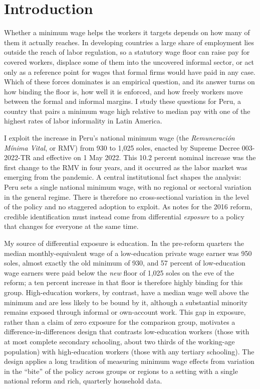 \section{Introduction}\label{sec:intro}

Whether a minimum wage helps the workers it targets depends on how many of them it actually reaches. In developing countries a large share of employment lies outside the reach of labor regulation, so a statutory wage floor can raise pay for covered workers, displace some of them into the uncovered informal sector, or act only as a reference point for wages that formal firms would have paid in any case. Which of these forces dominates is an empirical question, and its answer turns on how binding the floor is, how well it is enforced, and how freely workers move between the formal and informal margins. I study these questions for Peru, a country that pairs a minimum wage high relative to median pay with one of the highest rates of labor informality in Latin America.

I exploit the increase in Peru's national minimum wage (the \emph{Remuneración Mínima Vital}, or RMV) from 930 to 1,025 soles, enacted by Supreme Decree 003-2022-TR and effective on 1 May 2022. This 10.2 percent nominal increase was the first change to the RMV in four years, and it occurred as the labor market was emerging from the pandemic. A central institutional fact shapes the analysis: Peru sets a single national minimum wage, with no regional or sectoral variation in the general regime. There is therefore no cross-sectional variation in the level of the policy and no staggered adoption to exploit. As \citet{jimenez_2023} notes for the 2016 reform, credible identification must instead come from differential \emph{exposure} to a policy that changes for everyone at the same time.

My source of differential exposure is education. In the pre-reform quarters the median monthly-equivalent wage of a low-education private wage earner was 950 soles, almost exactly the old minimum of 930, and 57 percent of low-education wage earners were paid below the \emph{new} floor of 1,025 soles on the eve of the reform; a ten percent increase in that floor is therefore highly binding for this group. High-education workers, by contrast, have a median wage well above the minimum and are less likely to be bound by it, although a substantial minority remains exposed through informal or own-account work. This gap in exposure, rather than a claim of zero exposure for the comparison group, motivates a difference-in-differences design that contrasts low-education workers (those with at most complete secondary schooling, about two thirds of the working-age population) with high-education workers (those with any tertiary schooling). The design applies a long tradition of measuring minimum wage effects from variation in the ``bite'' of the policy across groups or regions \citep{card_1992, lee_1999, machin_manning_rahman_2003} to a setting with a single national reform and rich, quarterly household data.

